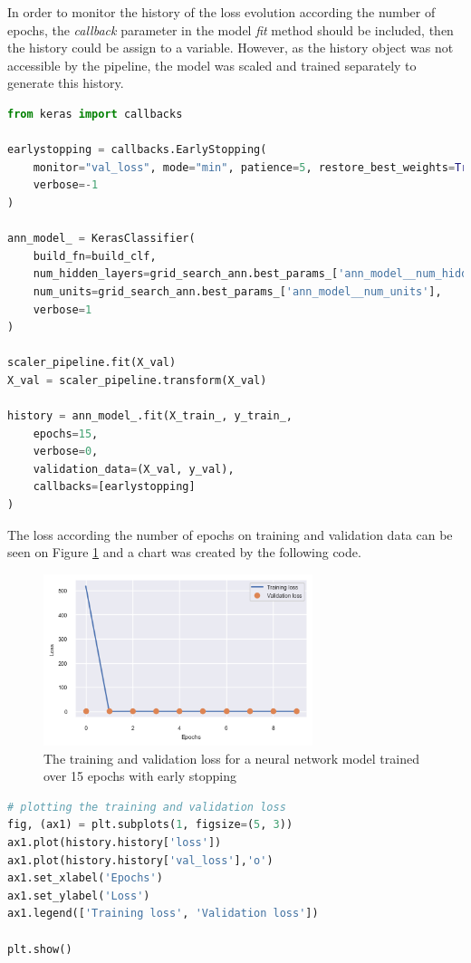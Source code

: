 \documentclass{article}
\begin{document}
In order to monitor the history of the loss evolution according the number of epochs, the \emph{callback} parameter in the model \emph{fit} method should be included, then the history could be assign to a variable. However, as the history object was not accessible by the pipeline, the model was scaled and trained separately to generate this history.

\begin{lstlisting}[language=Python]
from keras import callbacks

earlystopping = callbacks.EarlyStopping(
    monitor="val_loss", mode="min", patience=5, restore_best_weights=True, 
    verbose=-1
)

ann_model_ = KerasClassifier(
    build_fn=build_clf, 
    num_hidden_layers=grid_search_ann.best_params_['ann_model__num_hidden_layers'], 
    num_units=grid_search_ann.best_params_['ann_model__num_units'], 
    verbose=1
)

scaler_pipeline.fit(X_val)
X_val = scaler_pipeline.transform(X_val)

history = ann_model_.fit(X_train_, y_train_, 
    epochs=15, 
    verbose=0,
    validation_data=(X_val, y_val),
    callbacks=[earlystopping]
)
\end{lstlisting}

The loss according the number of epochs on training and validation data can be seen on Figure \ref{fig:loss_vs_epochs} and a chart was created by the following code.

\begin{figure}
\centering
\includegraphics[width=0.7\textwidth]{loss_vs_epochs.png}
\caption{\label{fig:loss_vs_epochs}The training and validation loss for a neural network model trained over 15 epochs with early stopping}
\end{figure}

\begin{lstlisting}[language=Python]
# plotting the training and validation loss
fig, (ax1) = plt.subplots(1, figsize=(5, 3))
ax1.plot(history.history['loss'])
ax1.plot(history.history['val_loss'],'o')
ax1.set_xlabel('Epochs')
ax1.set_ylabel('Loss')
ax1.legend(['Training loss', 'Validation loss'])

plt.show()
\end{lstlisting}
\end{document}
